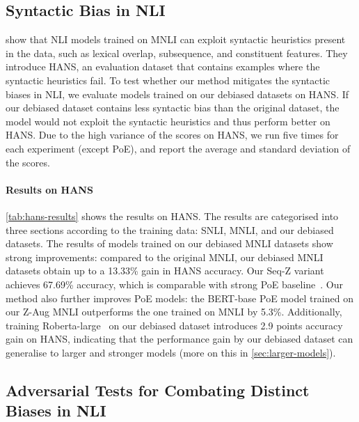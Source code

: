 \subsection{Syntactic Bias in NLI} \label{sec:hans-results}


\citet{hans} show that NLI models trained on MNLI can exploit syntactic heuristics present in the data, such as lexical overlap, subsequence, and constituent features.
They introduce HANS, an evaluation dataset that contains examples where the syntactic heuristics fail.
To test whether our method mitigates the syntactic biases in NLI, we evaluate models trained on our debiased datasets on HANS.
If our debiased dataset contains less syntactic bias than the original dataset, the model would not exploit the syntactic heuristics and thus perform better on HANS.
Due to the high variance of the scores on HANS, we run five times for each experiment (except PoE), and report the average and standard deviation of the scores.


\paragraph{Results on HANS}
\cref{tab:hans-results} shows the results on HANS.
The results are categorised into three sections according to the training data: SNLI, MNLI, and our debiased datasets.
The results of models trained on our debiased MNLI datasets show strong improvements: compared to the original MNLI, our debiased MNLI datasets obtain up to a 13.33\% gain in HANS accuracy.
Our Seq-Z variant achieves 67.69\% accuracy, which is comparable with strong PoE baseline~\citep{karimi-mahabadi-etal-2020-end, sanh2021learning}. 
Our method also further improves PoE models: the BERT-base PoE model trained on our Z-Aug MNLI outperforms the one trained on MNLI by 5.3\%.
Additionally, training Roberta-large~\citep{roberta} on our debiased dataset introduces 2.9 points accuracy gain on HANS, indicating that the performance gain by our debiased dataset can generalise to larger and stronger models (more on this in \cref{sec:larger-models}). 


\subsection{Adversarial Tests for Combating Distinct Biases in NLI} \label{sec:nli-adv-test}


